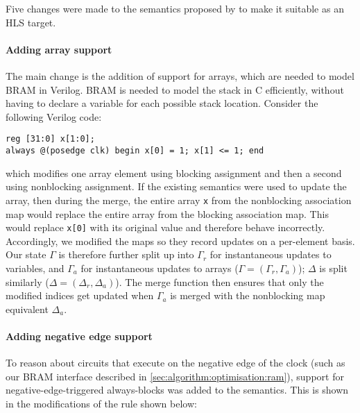 Five changes were made to the semantics proposed by
\textcite{lööw19_proof_trans_veril_devel_hol} to make it suitable as an HLS
target.

\paragraph{Adding array support}
The main change is the addition of support for arrays, which are needed to model
\gls{BRAM} in Verilog.  \gls{BRAM} is needed to model the stack in C
efficiently, without having to declare a variable for each possible stack
location.
Consider the following Verilog code:

\begin{center}
\begin{verbatim}
reg [31:0] x[1:0];
always @(posedge clk) begin x[0] = 1; x[1] <= 1; end
\end{verbatim}
\end{center}

which modifies one array element using blocking assignment and then a second
using nonblocking assignment. If the existing semantics were used to update the
array, then during the merge, the entire array \texttt{x} from the nonblocking
association map would replace the entire array from the blocking association
map.  This would replace \texttt{x[0]} with its original value and therefore
behave incorrectly. Accordingly, we modified the maps so they record updates on
a per-el\-em\-ent basis. Our state $\Gamma$ is therefore further split up into
$\Gamma_{r}$ for instantaneous updates to variables, and $\Gamma_{a}$ for
instantaneous updates to arrays ($\Gamma = (\Gamma_{r}, \Gamma_{a})$); $\Delta$
is split similarly ($\Delta = (\Delta_{r}, \Delta_{a})$). The merge function
then ensures that only the modified indices get updated when $\Gamma_{a}$ is
merged with the nonblocking map equivalent $\Delta_{a}$.

\paragraph{Adding negative edge support}
To reason about circuits that execute on the negative edge of the clock (such as
our \gls{BRAM} interface described in \cref{sec:algorithm:optimisation:ram}),
support for negative-edge-triggered always-blocks was added to the
semantics. This is shown in the modifications of the  rule
shown below:

